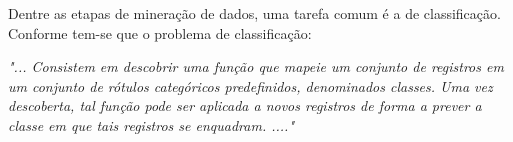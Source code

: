   Dentre as etapas de mineração de dados, uma tarefa comum é a de classificação.
  Conforme \cite{passos2005datamining} tem-se que o problema de classificação:

\begin{description}
  \item \textit{"... Consistem em descobrir uma função que mapeie um conjunto de
  registros em um conjunto de rótulos categóricos predefinidos, denominados
  classes. Uma vez descoberta, tal função pode ser aplicada a novos registros
  de forma a prever a classe em que tais registros se enquadram. ...."}
\end{description}


